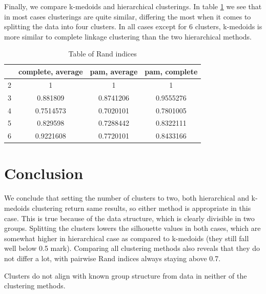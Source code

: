 \documentclass[12pt]{article}
\begin{document}
Finally, we compare k-medoids and hierarchical clusterings. In table \ref{tab:rand} we see that in most cases clusterings are quite similar, differing the most
when it comes to splitting the data into four clusters. In all cases except for 6 clusters, k-medoids is more similar
to complete linkage clustering than the two hierarchical methods.
  \begin{table}[h]
    \centering
  \begin{tabular}{ |c|c|c|c| } 
   \hline
   & complete, average  & pam, average & pam, complete \\
   \hline 
   2 & 1 & 1 & 1 \\ 
   3 & 0.881809 & 0.8741206 &0.9555276 \\ 
   4 & 0.7514573 &0.7020101 & 0.7801005 \\
   5 & 0.829598 &0.7288442 & 0.8322111 \\
   6 & 0.9221608 & 0.7720101& 0.8433166 \\
   \hline
  \end{tabular}
  \caption{Table of Rand indices}
  \label{tab:rand}
\end{table}

\section{Conclusion}

We conclude that setting the number of clusters to two, both hierarchical and k-medoids clustering return same results, so either method is appropriate in this case.
This is true because of the data structure, which is clearly divisible in two groups. Splitting the clusters lowers the silhouette values in both cases, which 
are somewhat higher in hierarchical case as compared to k-medoids (they still fall well below 0.5 mark). Comparing all clustering methods also reveals that they do not
differ a lot, with pairwise Rand indices always staying above 0.7.

Clusters do not align with known group structure from data in neither of the clustering methods.
\end{document}
